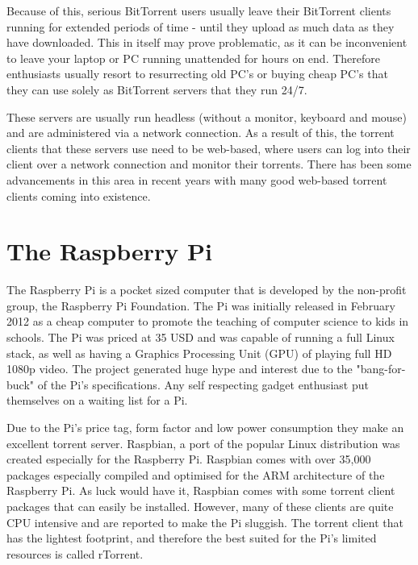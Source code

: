 Because of this, serious BitTorrent users usually leave their BitTorrent clients running for extended periods of time - until they upload as much data as they have downloaded. This in itself may prove problematic, as it can be inconvenient to leave your laptop or PC running unattended for hours on end. Therefore enthusiasts usually resort to resurrecting old PC's or buying cheap PC's that they can use solely as BitTorrent servers that they run 24/7.

These servers are usually run headless (without a monitor, keyboard and mouse) and are administered via a network connection. As a result of this, the torrent clients that these servers use need to be web-based, where users can log into their client over a network connection and monitor their torrents. There has been some advancements in this area in recent years with many good web-based torrent clients coming into existence.  


\section{The Raspberry Pi}
The Raspberry Pi is a pocket sized computer that is developed by the non-profit group, the Raspberry Pi Foundation. The Pi was initially released in February 2012 as a cheap computer to promote the teaching of computer science to kids in schools. The Pi was priced at 35 USD and was capable of running a full Linux stack, as well as having a Graphics Processing Unit (GPU) of playing full HD 1080p video. The project generated huge hype and interest due to the "bang-for-buck" of the Pi's specifications. Any self respecting gadget enthusiast put themselves on a waiting list for a Pi. 

Due to the Pi's price tag, form factor and low power consumption they make an excellent torrent server. Raspbian, a port of the popular Linux distribution was created especially for the Raspberry Pi. Raspbian comes with over 35,000 packages especially compiled and optimised for the ARM architecture of the Raspberry Pi. As luck would have it, Raspbian comes with some torrent client packages that can easily be installed. However, many of these clients are quite CPU intensive and are reported to make the Pi sluggish. The torrent client that has the lightest footprint, and therefore the best suited for the Pi's limited resources is called rTorrent. 

